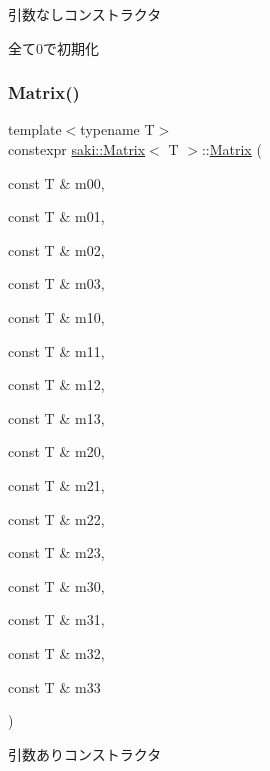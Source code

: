 引数なしコンストラクタ 

全て0で初期化 \mbox{\label{classsaki_1_1_matrix_ad4f497bd4ba2b7de464afea4436d9a51}} 
\subsubsection{\texorpdfstring{Matrix()}{Matrix()}\hspace{0.1cm}{\footnotesize\ttfamily [2/5]}}
{\footnotesize\ttfamily template$<$typename T$>$ \\
constexpr \mbox{\hyperlink{classsaki_1_1_matrix}{saki\+::\+Matrix}}$<$ T $>$\+::\mbox{\hyperlink{classsaki_1_1_matrix}{Matrix}} (\begin{DoxyParamCaption}\item[{const T \&}]{m00,  }\item[{const T \&}]{m01,  }\item[{const T \&}]{m02,  }\item[{const T \&}]{m03,  }\item[{const T \&}]{m10,  }\item[{const T \&}]{m11,  }\item[{const T \&}]{m12,  }\item[{const T \&}]{m13,  }\item[{const T \&}]{m20,  }\item[{const T \&}]{m21,  }\item[{const T \&}]{m22,  }\item[{const T \&}]{m23,  }\item[{const T \&}]{m30,  }\item[{const T \&}]{m31,  }\item[{const T \&}]{m32,  }\item[{const T \&}]{m33 }\end{DoxyParamCaption})\hspace{0.3cm}{\ttfamily [inline]}}



引数ありコンストラクタ 

\mbox{\label{classsaki_1_1_matrix_a945fec9cbcb1b175ac993db6a5c0cbd8}} 
